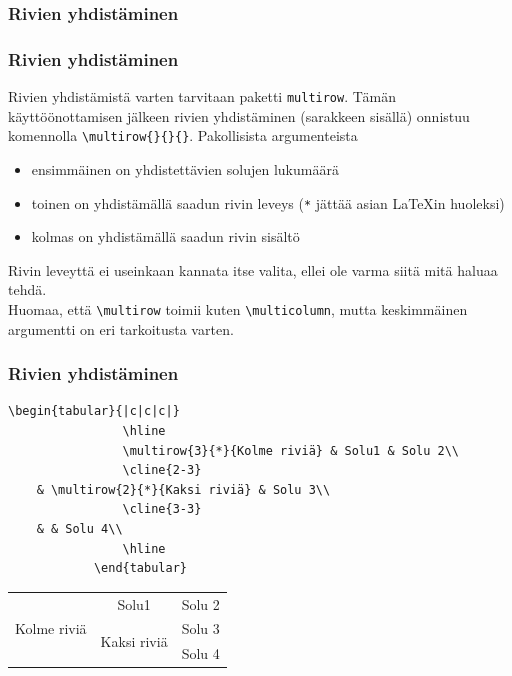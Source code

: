 \documentclass[handout,hyperref={colorlinks=true}]{beamer}
\theoremstyle{remark}
\newcommand{\vaihto}{\\ \vspace{10pt}}
\begin{document}
\subsubsection{Rivien yhdistäminen}
\begin{frame}[fragile]
    \frametitle{Rivien yhdistäminen}
    Rivien yhdistämistä varten tarvitaan paketti \verb-multirow-. Tämän käyttöönottamisen jälkeen rivien yhdistäminen (sarakkeen sisällä) onnistuu komennolla \verb-\multirow{}{}{}-. Pakollisista argumenteista
    \begin{itemize}
        \item ensimmäinen on yhdistettävien solujen lukumäärä
        \item toinen on yhdistämällä saadun rivin leveys (\verb-*- jättää asian \LaTeX in huoleksi)
        \item kolmas on yhdistämällä saadun rivin sisältö
    \end{itemize}
    Rivin leveyttä ei useinkaan kannata itse valita, ellei ole varma siitä mitä haluaa tehdä. 
    \vaihto
    Huomaa, että \verb-\multirow- toimii kuten \verb-\multicolumn-, mutta keskimmäinen argumentti on eri tarkoitusta varten.
\end{frame}
\begin{frame}[fragile]
    \frametitle{Rivien yhdistäminen} 
    \begin{scriptsize}
        \begin{Verbatim}[frame=single]
            \begin{tabular}{|c|c|c|}
                \hline
                \multirow{3}{*}{Kolme riviä} & Solu1 & Solu 2\\
                \cline{2-3}
    & \multirow{2}{*}{Kaksi riviä} & Solu 3\\
                \cline{3-3}
    & & Solu 4\\
                \hline
            \end{tabular}
        \end{Verbatim}
    \end{scriptsize}
    \begin{tabular}{|c|c|c|}
        \hline
        \multirow{3}{*}{Kolme riviä} & Solu1	& Solu 2\\\cline{2-3}
                                      & \multirow{2}{*}{Kaksi riviä}	& Solu 3\\\cline{3-3}
                                      & & Solu 4\\
        \hline
    \end{tabular}
\end{frame}
\end{document}
